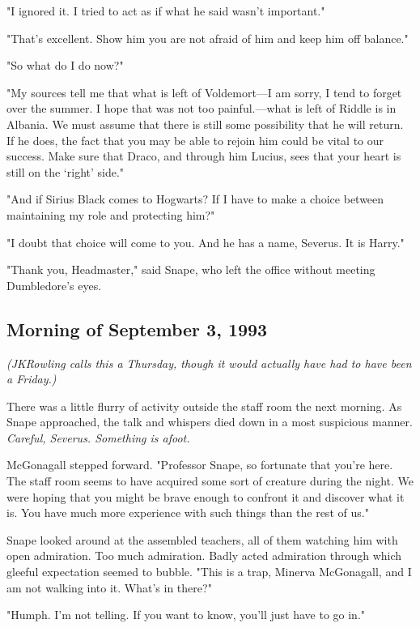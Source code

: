 "I ignored it. I tried to act as if what he said wasn't important."

"That's excellent. Show him you are not afraid of him and keep him off balance."

"So what do I do now?"

"My sources tell me that what is left of Voldemort—I am sorry, I tend to forget over the summer. I hope that was not too painful.—what is left of Riddle is in Albania. We must assume that there is still some possibility that he will return. If he does, the fact that you may be able to rejoin him could be vital to our success. Make sure that Draco, and through him Lucius, sees that your heart is still on the `right' side."

"And if Sirius Black comes to Hogwarts? If I have to make a choice between maintaining my role and protecting{\el} him?"

"I doubt that choice will come to you. And he has a name, Severus. It is Harry."

"Thank you, Headmaster," said Snape, who left the office without meeting Dumbledore's eyes.

\sbreak

\subsection{Morning of September 3, 1993}\emph{(JKRowling calls this a Thursday, though it would actually have had to have been a Friday.)}

There was a little flurry of activity outside the staff room the next morning. As Snape approached, the talk and whispers died down in a most suspicious manner. \emph{Careful, Severus. Something is afoot.}

McGonagall stepped forward. "Professor Snape, so fortunate that you're here. The staff room seems to have acquired some sort of creature during the night. We were hoping that you might be brave enough to confront it and discover what it is. You have much more experience with such things than the rest of us."

Snape looked around at the assembled teachers, all of them watching him with open admiration. Too much admiration. Badly acted admiration through which gleeful expectation seemed to bubble. "This is a trap, Minerva McGonagall, and I am not walking into it. What's in there?"

"Humph. I'm not telling. If you want to know, you'll just have to go in."

